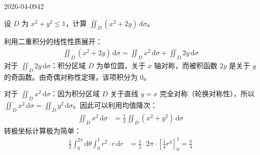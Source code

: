 \begin{mistake}{2026-04-09}{42}

\begin{problemcontent}
设 \( D \) 为 \( x^2 + y^2 \leqslant 1 \)，计算 \( \iint_D (x^2 + 2y)\,\mathrm{d}\sigma \)。
\end{problemcontent}

\begin{solutioncontent}
利用二重积分的线性性质展开：
\[
\begin{aligned}
\iint_D (x^2 + 2y)\,\mathrm{d}\sigma = \iint_D x^2\,\mathrm{d}\sigma + \iint_D 2y\,\mathrm{d}\sigma
\end{aligned}
\]
对于 \( \iint_D 2y\,\mathrm{d}\sigma \)：积分区域 \( D \) 为单位圆，关于 \( x \) 轴对称，而被积函数 \( 2y \) 是关于 \( y \) 的奇函数。由奇偶对称性定理，该项积分为 0。

对于 \( \iint_D x^2\,\mathrm{d}\sigma \)：因为积分区域 \( D \) 关于直线 \( y=x \) 完全对称（轮换对称性），所以 \( \iint_D x^2\,\mathrm{d}\sigma = \iint_D y^2\,\mathrm{d}\sigma \)。因此可以利用均值降次：
\[
\begin{aligned}
\iint_D x^2\,\mathrm{d}\sigma &= \frac{1}{2} \iint_D (x^2 + y^2)\,\mathrm{d}\sigma 
\end{aligned}
\]
转极坐标计算极为简单：
\[
\begin{aligned}
\frac{1}{2} \int_0^{2\pi} \mathrm{d}\theta \int_0^1 r^2 \cdot r\,\mathrm{d}r &= \frac{1}{2} \cdot 2\pi \cdot \left[ \frac{1}{4}r^4 \right]_0^1 = \frac{\pi}{4}
\end{aligned}
\]
\end{solutioncontent}


\end{mistake}
